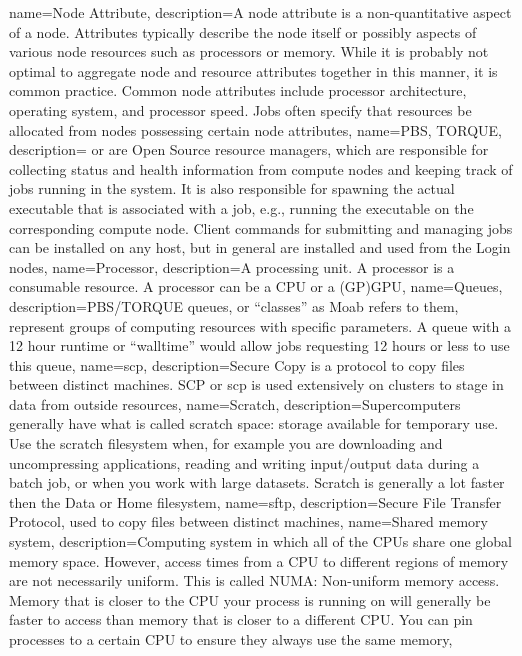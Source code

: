 {
  name={Node Attribute},
  description={A node attribute is a non-quantitative aspect of a node. Attributes typically describe the node itself or possibly aspects of various node resources such as processors or memory. While it is probably not optimal to aggregate node and resource attributes together in this manner, it is common practice. Common node attributes include processor architecture, operating system, and processor speed. Jobs often specify that resources be allocated from nodes possessing certain node attributes},
}
{
  name={PBS, TORQUE},
  description={ or  are Open Source resource managers, which are responsible for collecting status and health information from compute nodes and keeping track of jobs running in the system. It is also responsible for spawning the actual executable that is associated with a job, e.g., running the executable on the corresponding compute node. Client commands for submitting and managing jobs can be installed on any host, but in general are installed and used from the Login nodes},
}
{
  name={Processor},
  description={A processing unit. A processor is a consumable resource. A processor can be a CPU or a (GP)GPU},
}
{
  name={Queues},
  description={PBS/TORQUE queues, or ``classes'' as Moab refers to them, represent groups of computing resources with specific parameters. A queue with a 12 hour runtime or ``walltime'' would allow jobs requesting 12 hours or less to use this queue},
}
{
  name={scp},
  description={Secure Copy is a protocol to copy files between distinct machines. SCP or scp is used extensively on \hpc clusters to stage in data from outside resources},
}
{
  name={Scratch},
  description={Supercomputers generally have what is called scratch space: storage available for temporary use. Use the scratch filesystem when, for example you are downloading and uncompressing applications, reading and writing input/output data during a batch job, or when you work with large datasets. Scratch is generally a lot faster then the Data or Home filesystem},
}
{
  name={sftp},
  description={Secure File Transfer Protocol, used to copy files between distinct machines},
}
{
  name={Shared memory system},
  description={Computing system in which all of the CPUs share one global memory space. However, access times from a CPU to different regions of memory are not necessarily uniform. This is called NUMA: Non-uniform memory access. Memory that is closer to the CPU your process is running on will generally be faster to access than memory that is closer to a different CPU. You can pin processes to a certain CPU to ensure they always use the same memory},
}
